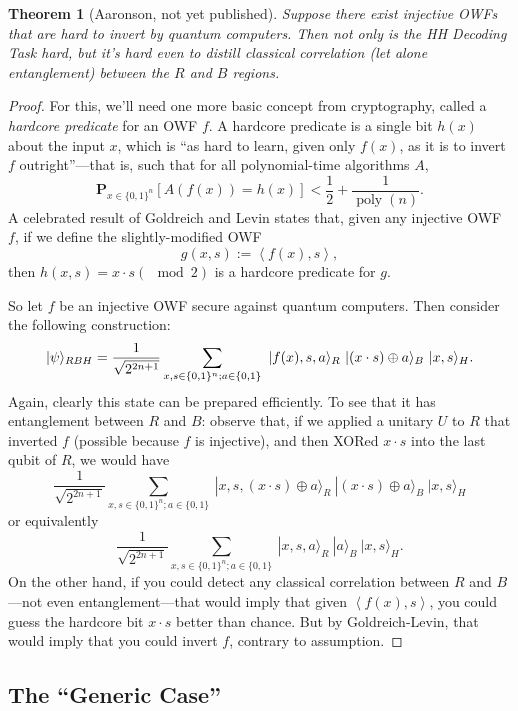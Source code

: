 \documentclass[11pt]{report}
\theoremstyle{plain}
\newtheorem{theorem}{Theorem}[section]
\theoremstyle{definition}
\renewcommand{\Pr}{\mathbf{P}}
\renewcommand{\ket}[1]{|#1\rangle}
\begin{document}
\begin{theorem}[Aaronson, not yet published]
Suppose there exist injective OWFs that are hard to invert by quantum computers.  Then not only is the HH Decoding Task hard, but it's hard even to distill
{\em classical correlation} (let alone entanglement) between the $R$ and $B$ regions.
\end{theorem}
\begin{proof}
For this, we'll need one more basic concept from cryptography, called
a {\em hardcore predicate} for an OWF $f$.  A hardcore predicate is a single bit $h(x)$ about the input $x$, which is ``as hard to learn, given only $f(x)$, as it is to invert $f$ outright''---that is, such that for all polynomial-time algorithms $A$,
$$ \Pr_{x\in \{0,1\}^n }[ A(f(x))=h(x) ] < \frac{1}{2} + \frac{1}{\operatorname*{poly}(n)}.$$
A celebrated result of Goldreich and Levin \cite{GL89} states that, given any injective OWF $f$, if we define the slightly-modified OWF
$$ g(x,s) := \left\langle f(x),s \right\rangle, $$
then $h(x,s) = x \cdot s (\mod 2)$ is a hardcore predicate for $g$.

So let $f$ be an injective OWF secure against quantum computers.  Then consider the following construction:
$$ \ket{\psi}_{RBH} = {1\over\sqrt{2^{2n+1}}} \sum_{x,s \in \{0,1\}^n; a\in \{0,1\}} \ \ket{f(x),s,a}_R \  \ket{(x\cdot s) \oplus a}_B \ \ket{x,s}_H. $$
Again, clearly this state can be prepared efficiently.  To see that it has entanglement between $R$ and $B$: observe that, if we applied a unitary $U$ to $R$ that inverted $f$ (possible because $f$ is injective), and then XORed $x\cdot s$ into the last qubit of $R$, we would have
$$ \frac{1}{\sqrt{2^{2n+1}}} \sum_{x,s \in \{0,1\}^n; a\in \{0,1\}} \ \ket{x,s,(x\cdot s) \oplus a}_R \  \ket{(x\cdot s) \oplus a}_B \ \ket{x,s}_H $$
or equivalently
$$ \frac{1}{\sqrt{2^{2n+1}}} \sum_{x,s \in \{0,1\}^n; a\in \{0,1\}} \ \ket{x,s,a}_R \  \ket{a}_B \ \ket{x,s}_H. $$
On the other hand, if you could detect any classical correlation between $R$ and $B$---not even entanglement---that would imply that given $\left\langle f(x),s \right\rangle$, you could guess the hardcore bit $x\cdot s$ better than chance.  But by Goldreich-Levin, that would imply that you could invert $f$, contrary to assumption.
\end{proof}

\subsection{The ``Generic Case''}
\label{ITSWORSE}
\end{document}
